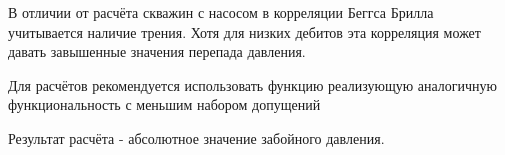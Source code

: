 \documentclass[]{scrreprt}
\begin{document}
В отличии от расчёта скважин с насосом в корреляции Беггса Брилла учитывается наличие трения. Хотя для низких дебитов эта корреляция может давать завышенные значения перепада давления. 

Для расчётов рекомендуется использовать функцию \unf реализующую аналогичную функциональность с меньшим набором допущений

Результат расчёта - абсолютное значение забойного давления. 


\cite{HasanKabir_HeatTransfer_2002}

{}



\end{document}

